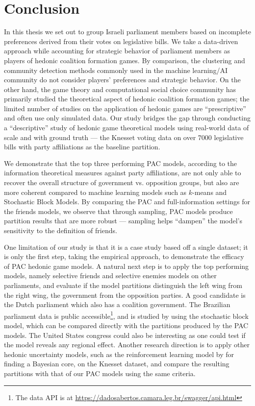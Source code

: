 \chapter{Conclusion}
\label{ch:concl}

In this thesis we set out to group Israeli parliament members
based on incomplete preferences derived from their votes on legislative bills.
We take a data-driven approach while accounting for strategic behavior of
parliament members as players of hedonic coalition formation games.
By comparison, the clustering and community detection methods commonly used in
the machine learning/AI community do not consider players' preferences and
strategic behavior.
On the other hand, the game theory and computational social choice community has primarily
studied the theoretical aspect of hedonic coalition formation games;
the limited number of studies on the application of hedonic games are
``prescriptive'' and often use only simulated data.
Our study bridges the gap through conducting a ``descriptive'' study of hedonic
game theoretical models using real-world data of scale and with ground truth ---
the Knesset voting data on over 7000 legislative bills with party affiliations as
the baseline partition.

We demonstrate that the top three performing PAC models, according to the
information theoretical measures against party affiliations, are not only able
to recover the overall structure of government vs. opposition groups, but also
are more coherent compared to machine learning models such as $k$-means and
Stochastic Block Models.
By comparing the PAC and full-information settings for the friends models, we
observe that through sampling, PAC models produce partition results that are
more robust --- sampling helps ``dampen'' the model's sensitivity to the
definition of friends.

One limitation of our study is that it is a case study based off a single
dataset; it is only the first step, taking the empirical approach, to
demonstrate the efficacy of PAC hedonic game models.
A natural next step is to apply the top performing models, namely selective
friends and selective enemies models on other parliaments, and evaluate if the
model partitions distinguish the left wing from the right wing, the government
from the opposition parties.
A good candidate is the Dutch parliament which also has a coalition government. 
The Brazilian parliament data is public accessible\footnote{The data API is at
\url{https://dadosabertos.camara.leg.br/swagger/api.html}}, and is studied by
 using the stochastic block model, which can be compared
directly with the partitions produced by the PAC models.
The United States congress could also be interesting as one could test if the
model reveals any regional effect.
Another research direction is to apply other hedonic uncertainty models, such
as the reinforcement learning model by  for
finding a Bayesian core, on the Knesset dataset, and compare the resulting
partitions with that of our PAC models using the same criteria.
